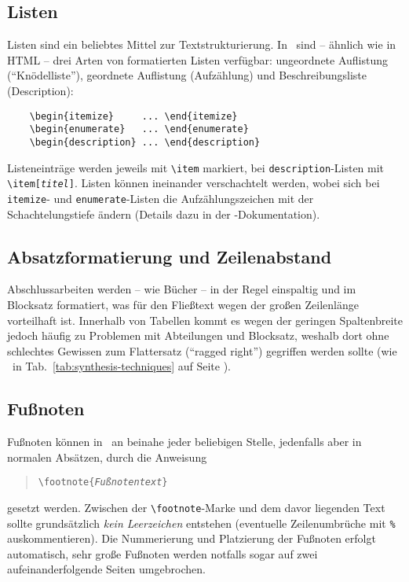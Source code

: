 \subsection{Listen}

Listen sind ein beliebtes Mittel zur Textstrukturierung. In
\latex\ sind -- ähnlich wie in HTML -- drei Arten von formatierten
Listen verfügbar: ungeordnete Auflistung ("`Knödelliste"'),
geordnete Auflistung (Aufzählung) und Beschreibungsliste
(Description):
%
\begin{verbatim}
    \begin{itemize}     ... \end{itemize}
    \begin{enumerate}   ... \end{enumerate}
    \begin{description} ... \end{description}
\end{verbatim}
%
Listeneinträge werden jeweils mit \verb!\item! markiert, bei \texttt{description}-Listen mit \verb!\item[!\texttt{\em titel}\verb!]!. Listen
können ineinander verschachtelt werden, wobei sich bei \texttt{itemize}- und \texttt{enumerate}-Listen die Aufzählungszeichen mit
der Schachtelungstiefe ändern (Details dazu in der
\latex-Dokumentation).


\subsection{Absatzformatierung und Zeilenabstand}

Abschlussarbeiten werden -- wie Bücher -- in der Regel einspaltig und
im Blocksatz formatiert, was für den Fließtext wegen der großen
Zeilenlänge vorteilhaft ist. Innerhalb von Tabellen kommt es
wegen der geringen Spaltenbreite jedoch häufig zu Problemen mit
Abteilungen und Blocksatz, weshalb dort ohne schlechtes
Gewissen zum Flattersatz ("`ragged right"') gegriffen werden sollte (wie
\zB\ in Tab.~\ref{tab:synthesis-techniques} auf Seite
\pageref{tab:synthesis-techniques}).


\subsection{Fußnoten}
Fußnoten können in \latex\ an beinahe jeder beliebigen Stelle,
jedenfalls aber in normalen Absätzen, durch die Anweisung
%
\begin{quote}
\verb!\footnote{!\texttt{\em Fußnotentext}\verb!}!
\end{quote}
%
gesetzt werden. Zwischen der \verb!\footnote!-Marke und dem davor
liegenden Text sollte grundsätzlich \emph{kein Leerzeichen} entstehen (eventuelle
Zeilen\-um\-brüche mit \verb!%! auskommentieren).
Die Nummerierung und Platzierung der Fußnoten
erfolgt automatisch, sehr große Fußnoten werden notfalls sogar auf
zwei aufeinanderfolgende Seiten umgebrochen.


